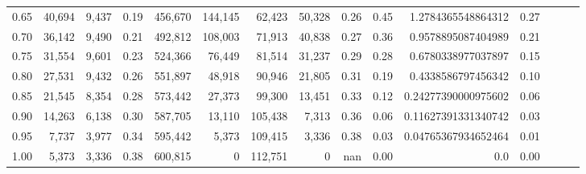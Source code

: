\begin{tabular}{rrrrrrrrrrrrrrr}
0.65 &  40,694 &  9,437 &  0.19 &  456,670 &  144,145 &   62,423 &   50,328 &  0.26 &  0.45 &   1.2784365548864312 &      0.27 \\
0.70 &  36,142 &  9,490 &  0.21 &  492,812 &  108,003 &   71,913 &   40,838 &  0.27 &  0.36 &   0.9578895087404989 &      0.21 \\
0.75 &  31,554 &  9,601 &  0.23 &  524,366 &   76,449 &   81,514 &   31,237 &  0.29 &  0.28 &   0.6780338977037897 &      0.15 \\
0.80 &  27,531 &  9,432 &  0.26 &  551,897 &   48,918 &   90,946 &   21,805 &  0.31 &  0.19 &   0.4338586797456342 &      0.10 \\
0.85 &  21,545 &  8,354 &  0.28 &  573,442 &   27,373 &   99,300 &   13,451 &  0.33 &  0.12 &  0.24277390000975602 &      0.06 \\
0.90 &  14,263 &  6,138 &  0.30 &  587,705 &   13,110 &  105,438 &    7,313 &  0.36 &  0.06 &  0.11627391331340742 &      0.03 \\
0.95 &   7,737 &  3,977 &  0.34 &  595,442 &    5,373 &  109,415 &    3,336 &  0.38 &  0.03 &  0.04765367934652464 &      0.01 \\
1.00 &   5,373 &  3,336 &  0.38 &  600,815 &        0 &  112,751 &        0 &   nan &  0.00 &                  0.0 &      0.00 \\
\bottomrule
\end{tabular}
